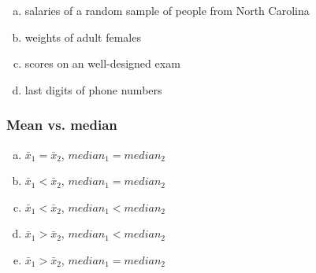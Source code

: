 \documentclass[11pt,containsverbatim,handout,xcolor=xelatex,dvipsnames,table]{beamer}
\newcommand{\solnMult}[1]{#1}
\begin{document}

\begin{frame}
\frametitle{}


\begin{enumerate}[(a)]
\item salaries of a random sample of people from North Carolina
\item \solnMult{weights of adult females}
\item scores on an well-designed exam
\item last digits of phone numbers
\end{enumerate}

\end{frame}


\begin{frame}
\frametitle{Mean vs. median}


\begin{enumerate}[(a)]
\item $\bar{x}_1 = \bar{x}_2$, $median_1 = median_2$
\item \solnMult{$\bar{x}_1 < \bar{x}_2$, $median_1 = median_2$}
\item $\bar{x}_1 < \bar{x}_2$, $median_1 < median_2$
\item $\bar{x}_1 > \bar{x}_2$, $median_1 < median_2$
\item $\bar{x}_1 > \bar{x}_2$, $median_1 = median_2$
\end{enumerate}

\end{frame}

\end{document}
